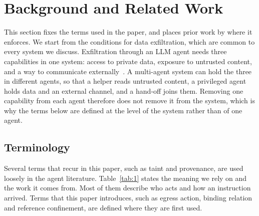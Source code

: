 \documentclass[conference,compsoc]{IEEEtran}
\begin{document}
\section{Background and Related Work}\label{sec:2}

This section fixes the terms used in the paper, and places prior work by where it enforces. We start from the conditions for data exfiltration, which are common to every system we discuss. Exfiltration through an LLM agent needs three capabilities in one system: access to private data, exposure to untrusted content, and a way to communicate externally~\cite{willison2025trifecta}. A multi-agent system can hold the three in different agents, so that a helper reads untrusted content, a privileged agent holds data and an external channel, and a hand-off joins them. Removing one capability from each agent therefore does not remove it from the system, which is why the terms below are defined at the level of the system rather than of one agent.

\subsection{Terminology}\label{sec:2.1}

Several terms that recur in this paper, such as taint and provenance, are used loosely in the agent literature. Table~\ref{tab:1} states the meaning we rely on and the work it comes from. Most of them describe who acts and how an instruction arrived. Terms that this paper introduces, such as egress action, binding relation and reference confinement, are defined where they are first used.
\end{document}
